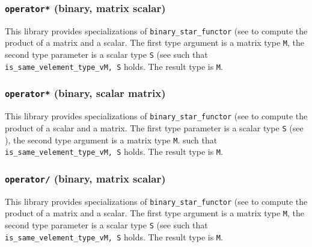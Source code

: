 \documentclass[oneside]{book}
\begin{document}
\subsubsection{\texttt{operator*} (binary, matrix scalar)}
This library provides specializations of
\texttt{binary\_star\_functor}
(see \cite{arithmeticfunctors} to compute the
product of a matrix and a scalar.
The first type argument is a matrix type \texttt{M}, the second type parameter is a scalar type \texttt{S} (see \cite{mathscalars}
such that \texttt{is\_same\_v\textlangle element\_type\_v\textlangle M\textrangle, S\textrangle} holds.
The result type is \texttt{M}.

\subsubsection{\texttt{operator*} (binary, scalar matrix)}
This library provides specializations of
\texttt{binary\_star\_functor}
(see \cite{arithmeticfunctors} to compute the
product of a scalar and a matrix.
The first type parameter is a scalar type \texttt{S} (see \cite{mathscalars}), the second type argument is a matrix type \texttt{M}.
such that \texttt{is\_same\_v\textlangle element\_type\_v\textlangle M\textrangle, S\textrangle} holds.
The result type is \texttt{M}.

\subsubsection{\texttt{operator/} (binary, matrix scalar)}
This library provides specializations of
\texttt{binary\_star\_functor}
(see \cite{arithmeticfunctors} to compute the
product of a matrix and a scalar.
The first type argument is a matrix type \texttt{M}, the second type parameter is a scalar type \texttt{S} (see \cite{mathscalars}
such that \texttt{is\_same\_v\textlangle element\_type\_v\textlangle M\textrangle, S\textrangle} holds.
The result type is \texttt{M}.
\end{document}
